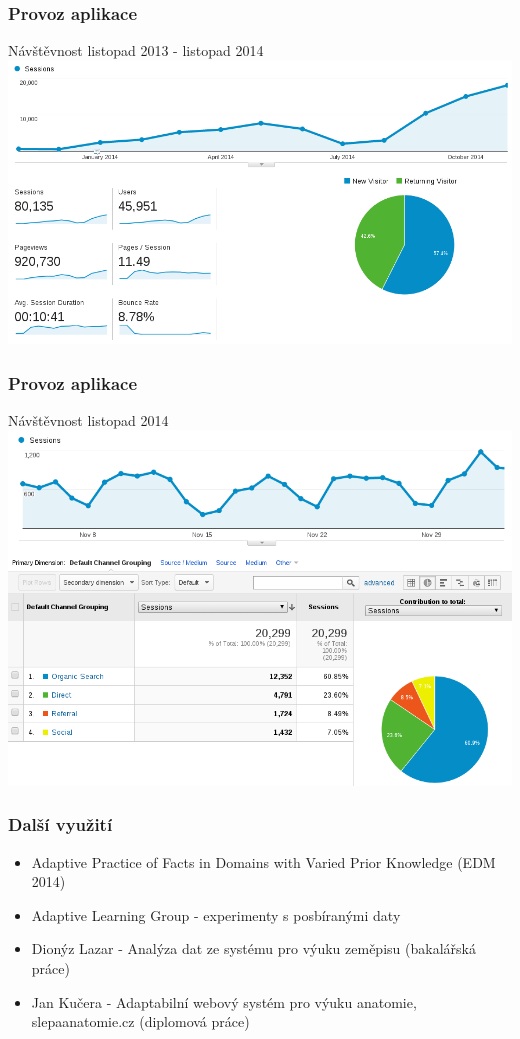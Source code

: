 \documentclass[xcolor=svgnames]{beamer}
\begin{document}
\begin{frame}
	\frametitle{Provoz aplikace}
	 Návštěvnost listopad 2013 - listopad 2014
   \includegraphics[width=\textwidth]{img/audience.png}
\end{frame}
\begin{frame}
	\frametitle{Provoz aplikace}
	 Návštěvnost listopad 2014
   \includegraphics[width=\textwidth]{img/audience-latest.png}
\end{frame}
\begin{frame}
	\frametitle{Další využití}
  \begin{itemize}
  \item Adaptive Practice of Facts in Domains with Varied Prior Knowledge (EDM 2014)
  \item Adaptive Learning Group - experimenty s posbíranými daty
  \item Dionýz Lazar - Analýza dat ze systému pro výuku zeměpisu (bakalářská práce)
  \item Jan Kučera - Adaptabilní webový systém pro výuku anatomie, slepaanatomie.cz (diplomová práce)
  \end{itemize}
\end{frame}
\end{document}
